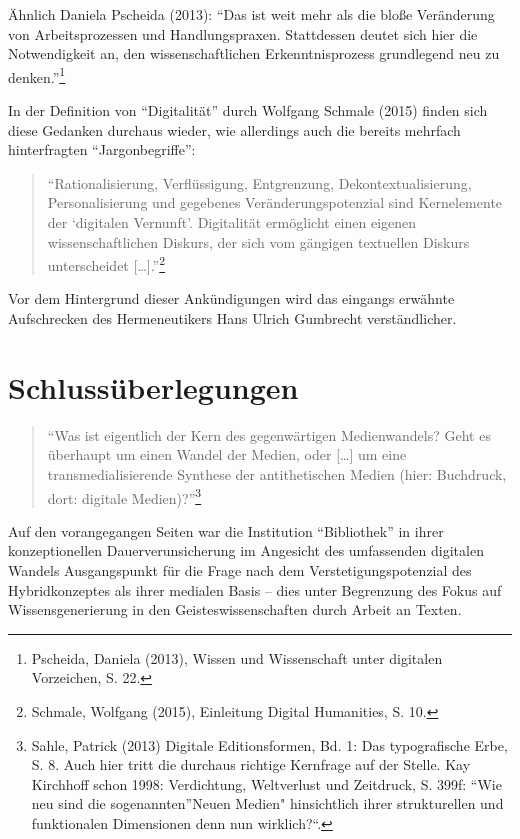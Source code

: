 \documentclass[a4paper,
fontsize=11pt,
oneside,
numbers=noperiodatend,
parskip=half-,
bibliography=totoc,
final
]{scrartcl}
\begin{document}
Ähnlich Daniela Pscheida (2013): \enquote{Das ist weit mehr als die
bloße Veränderung von Arbeitsprozessen und Handlungspraxen. Stattdessen
deutet sich hier die Notwendigkeit an, den wissenschaftlichen
Erkenntnisprozess grundlegend neu zu denken.}\footnote{Pscheida, Daniela
  (2013), Wissen und Wissenschaft unter digitalen Vorzeichen, S. 22.}

In der Definition von \enquote{Digitalität} durch Wolfgang Schmale
(2015) finden sich diese Gedanken durchaus wieder, wie allerdings auch
die bereits mehrfach hinterfragten \enquote{Jargonbegriffe}:

\begin{quote}
\enquote{Rationalisierung, Verflüssigung, Entgrenzung,
Dekontextualisierung, Personalisierung und gegebenes
Veränderungspotenzial sind Kernelemente der \enquote{digitalen
Vernunft}. Digitalität ermöglicht einen eigenen wissenschaftlichen
Diskurs, der sich vom gängigen textuellen Diskurs unterscheidet
{[}\ldots{}{]}.}\footnote{Schmale, Wolfgang (2015), Einleitung Digital
  Humanities, S. 10.}
\end{quote}

Vor dem Hintergrund dieser Ankündigungen wird das eingangs erwähnte
Aufschrecken des Hermeneutikers Hans Ulrich Gumbrecht verständlicher.

\section*{Schlussüberlegungen}\label{schlussuxfcberlegungen}

\begin{quote}
\enquote{Was ist eigentlich der Kern des gegenwärtigen Medienwandels?
Geht es überhaupt um einen Wandel der Medien, oder {[}\ldots{}{]} um
eine transmedialisierende Synthese der antithetischen Medien (hier:
Buchdruck, dort: digitale Medien)?}\footnote{Sahle, Patrick (2013)
  Digitale Editionsformen, Bd. 1: Das typografische Erbe, S. 8. Auch
  hier tritt die durchaus richtige Kernfrage auf der Stelle. Kay
  Kirchhoff schon 1998: Verdichtung, Weltverlust und Zeitdruck, S. 399f:
  \enquote{Wie neu sind die sogenannten}Neuen Medien" hinsichtlich ihrer
  strukturellen und funktionalen Dimensionen denn nun wirklich?``.}
\end{quote}

Auf den vorangegangen Seiten war die Institution \enquote{Bibliothek} in
ihrer konzeptionellen Dauerverunsicherung im Angesicht des umfassenden
digitalen Wandels Ausgangspunkt für die Frage nach dem
Verstetigungspotenzial des Hybridkonzeptes als ihrer medialen Basis --
dies unter Begrenzung des Fokus auf Wissensgenerierung in den
Geisteswissenschaften durch Arbeit an Texten.
\end{document}
